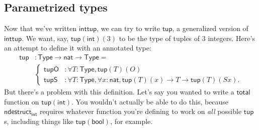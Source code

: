 \documentclass[11pt,paper=letter]{scrartcl}
\newcommand{\sf}{\mathsf}
\newcommand{\type}{\mathsf{Type}}
\begin{document}
\subsection{Parametrized types}

Now that we've written $\sf{inttup}$, we can try to write $\sf{tup}$, a generalized version of $\sf{inttup}$. We want, say, $\sf{tup}(\sf{int})(3)$ to be the type of tuples of $3$ integers. Here's an attempt to define it with an annotated type:
\begin{align*}
\sf{tup}&: \type \to \sf{nat} \to \type =\\
&\begin{cases}
\sf{tupO}&: \forall T: \type, \sf{tup}(T)(O) \\
\sf{tupS}&: \forall T: \type, \forall x: \sf{nat}, \sf{tup}(T)(x) \to T \to \sf{tup}(T)(Sx).
\end{cases}
\end{align*}
But there's a problem with this definition. Let's say you wanted to write a $\sf{total}$ function on $\sf{tup}(\sf{int})$. You wouldn't actually be able to do this, because $\sf{ndestruct}_{\sf{int}}$ requires whatever function you're defining to work on \emph{all} possible $\sf{tup}$s, including things like $\sf{tup}(\sf{bool})$, for example.
\end{document}
